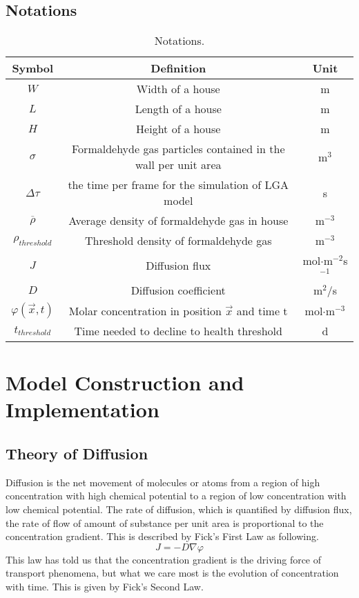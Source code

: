 \documentclass{mcmthesis}
\begin{document}
\subsection{Notations}

\begin{table}[H]
  \begin{center}
    \caption{Notations.}
    \label{tab:Not}
    \begin{tabular}{ccc}
      \toprule
      Symbol & Definition & Unit\\
      \midrule
      $W$ & Width of a house & m\\
      $L$ & Length of a house & m\\
      $H$ & Height of a house & m\\
      $\sigma$ & Formaldehyde gas particles contained in the wall per unit area & m$^3$\\
      $\Delta \tau$ & the time per frame for the simulation of LGA model & s\\
      $\overline \rho $ & Average density of formaldehyde gas in house & m$^{-3}$\\
      $\rho_{threshold}$ & Threshold density of formaldehyde gas & m$^{-3}$\\
      $J$ & Diffusion flux & mol$\cdot$m$^{-2}$s$^{-1}$\\
      $D$ & Diffusion coefficient & m$^2$/s\\
      $\varphi(\vec{x},t)$ & Molar concentration in position $\vec{x}$ and time t& mol$\cdot$m$^{-3}$\\
      $t_{threshold}$ & Time needed to decline to health threshold & d\\
      \bottomrule
    \end{tabular}
  \end{center}
\end{table}

\section{Model Construction and Implementation}
\subsection{Theory of Diffusion}
Diffusion is the net movement of molecules or atoms from a region of high concentration with high chemical potential to a region of low concentration with low chemical potential. The rate of diffusion, which is quantified by diffusion flux, the rate of flow of amount of substance per unit area is proportional to the concentration gradient. This is described by Fick's First Law as following.
\begin{equation}
J=-D\nabla\varphi
\end{equation}
This law has told us that the concentration gradient is the driving force of transport phenomena, but what we care most is the evolution of concentration with time. This is given by Fick's Second Law.
\end{document}
